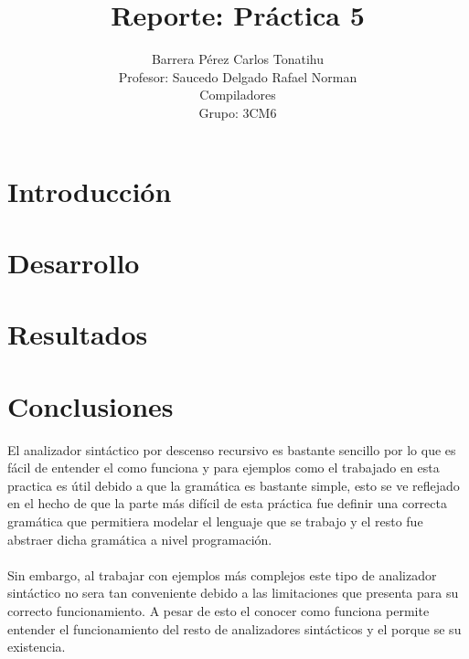 \documentclass[12pt, titlepage]{article}
\title{Reporte: Práctica 5}
\author{Barrera Pérez Carlos Tonatihu \\ Profesor: Saucedo Delgado Rafael Norman 
\\ Compiladores \\ Grupo: 3CM6}
\begin{document}
\maketitle
\tableofcontents
\newpage
\section{Introducción}

\section{Desarrollo}
\section{Resultados}
\newpage
\section{Conclusiones}
El analizador sintáctico por descenso recursivo es bastante sencillo por lo que 
es fácil de entender el como funciona y para ejemplos como el trabajado en esta 
practica es útil debido a que la gramática es bastante simple, esto se ve 
reflejado en el hecho de que la parte más difícil de esta práctica fue definir 
una correcta gramática que permitiera modelar el lenguaje que se trabajo y el 
resto fue abstraer dicha gramática a nivel programación.
\\\\
Sin embargo, al trabajar con ejemplos más complejos este tipo de analizador 
sintáctico no sera tan conveniente debido a las limitaciones que presenta para 
su correcto funcionamiento.
A pesar de esto el conocer como funciona permite entender el funcionamiento del 
resto de analizadores sintácticos y el porque se su existencia.
 

\end{document}
